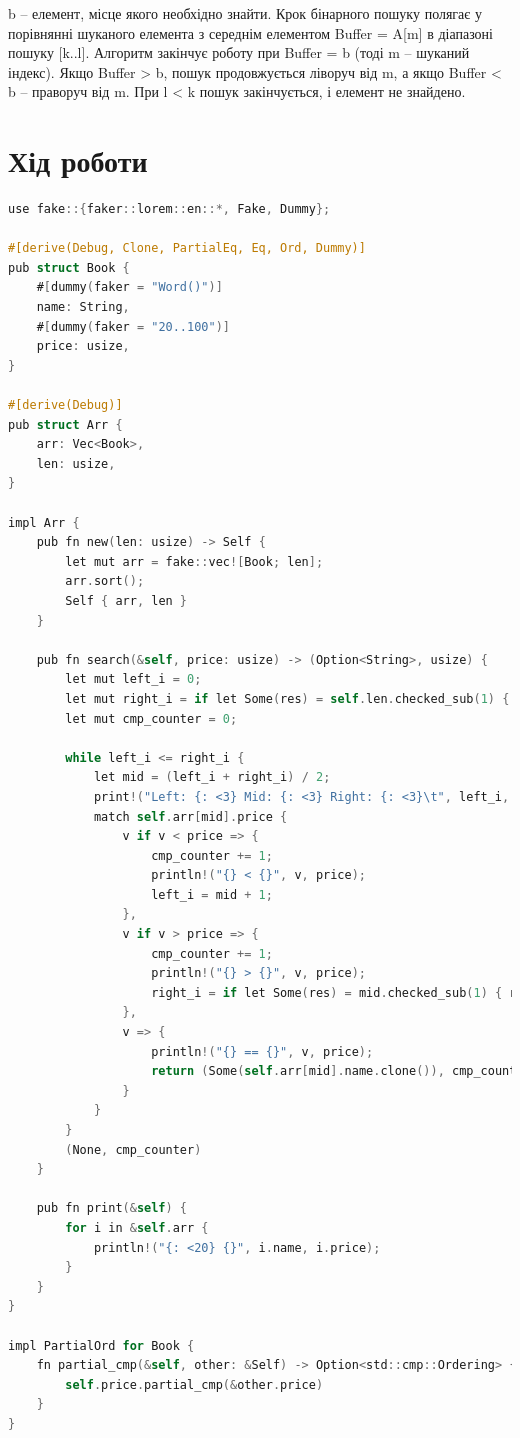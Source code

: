 \documentclass{article}
\begin{document}
\begin{normalsize}
		b – елемент, місце якого необхідно знайти. Крок бінарного пошуку полягає у порівнянні шуканого елемента з середнім елементом Buffer = A[m] в діапазоні пошуку [k..l]. Алгоритм закінчує роботу при Buffer = b (тоді m – шуканий індекс). Якщо Buffer > b, пошук продовжується ліворуч від m, а якщо Buffer < b – праворуч від m. При l < k пошук закінчується, і елемент не знайдено.
		
		\section*{Хід роботи}
		\begin{lstlisting}[language=C]
use fake::{faker::lorem::en::*, Fake, Dummy};

#[derive(Debug, Clone, PartialEq, Eq, Ord, Dummy)]
pub struct Book {
	#[dummy(faker = "Word()")]
	name: String, 
	#[dummy(faker = "20..100")]
	price: usize,
}

#[derive(Debug)]
pub struct Arr {
	arr: Vec<Book>,
	len: usize,
}

impl Arr {
	pub fn new(len: usize) -> Self {
		let mut arr = fake::vec![Book; len];
		arr.sort();
		Self { arr, len }
	}
	
	pub fn search(&self, price: usize) -> (Option<String>, usize) {
		let mut left_i = 0;
		let mut right_i = if let Some(res) = self.len.checked_sub(1) { res } else { return (None, 0) };
		let mut cmp_counter = 0;
		
		while left_i <= right_i {
			let mid = (left_i + right_i) / 2;
			print!("Left: {: <3} Mid: {: <3} Right: {: <3}\t", left_i, mid, right_i);
			match self.arr[mid].price {
				v if v < price => {
					cmp_counter += 1;
					println!("{} < {}", v, price);
					left_i = mid + 1;
				},
				v if v > price => {
					cmp_counter += 1;
					println!("{} > {}", v, price);
					right_i = if let Some(res) = mid.checked_sub(1) { res } else { break; };
				},
				v => {
					println!("{} == {}", v, price);
					return (Some(self.arr[mid].name.clone()), cmp_counter);
				}
			}
		}
		(None, cmp_counter)
	}
	
	pub fn print(&self) {
		for i in &self.arr {
			println!("{: <20} {}", i.name, i.price);
		}
	}
}

impl PartialOrd for Book {
	fn partial_cmp(&self, other: &Self) -> Option<std::cmp::Ordering> {
		self.price.partial_cmp(&other.price)
	}
}

		\end{lstlisting}
		

\end{normalsize}
\end{document}
